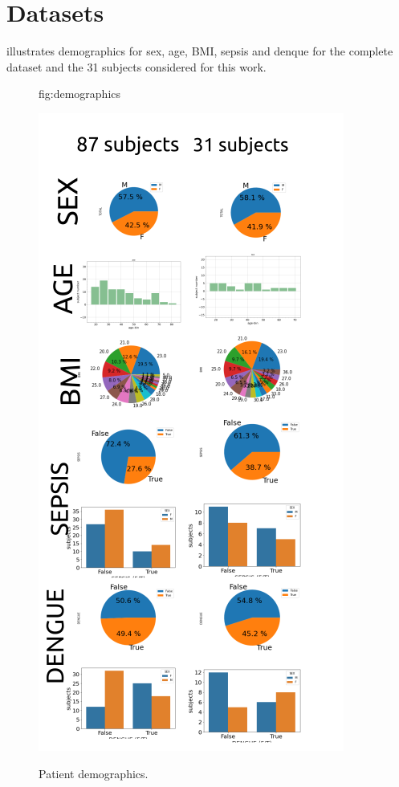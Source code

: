 \documentclass[mlabstract,twocolumn]{jmlr}
\begin{document}


\appendix

\section{Datasets}\label{apd:datasets}
 illustrates demographics for sex, age, BMI, sepsis and denque for the complete dataset and the 31 subjects considered for this work.
\begin{figure}[htbp]
\floatconts
  {fig:demographics}
  {\caption{Patient demographics.}} %
  {\includegraphics[width=\columnwidth]{../figures/patient-demographics-and-diseases/versions/drawing-v01}}%

\end{figure}
\end{document}

